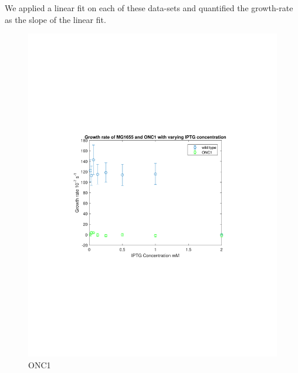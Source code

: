 \documentclass[11pt]{book}
\begin{document}
We applied a linear fit on each of these data-sets and quantified the growth-rate as the slope of the linear fit. 

\begin{figure}
\centering
\includegraphics[scale=0.8]{ONC1growthrate.pdf}
\caption{ONC1}
\label{fig:GrowthrateODONC1}
\end{figure}
\end{document}
